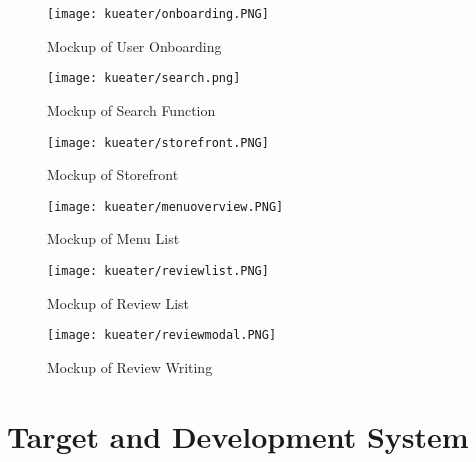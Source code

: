 \begin{figure}[h!]
    \begin{minipage}{.5\textwidth}
        \centering
        \texttt{[image: kueater/onboarding.PNG]}
        \small{\caption{Mockup of User Onboarding}}
    \end{minipage}%
    \begin{minipage}{.5\textwidth}
        \centering
        \texttt{[image: kueater/search.png]}
        \small{\caption{Mockup of Search Function}}
    \end{minipage}
    \vspace*{-\baselineskip}
\end{figure}

\begin{figure}[h!]
    \begin{minipage}{.5\textwidth}
        \centering
        \texttt{[image: kueater/storefront.PNG]}
        \small{\caption{Mockup of Storefront}}
    \end{minipage}%
    \begin{minipage}{.5\textwidth}
        \centering
        \texttt{[image: kueater/menuoverview.PNG]}
        \small{\caption{Mockup of Menu List}}
    \end{minipage}
    \vspace*{-\baselineskip}
\end{figure}


\begin{figure}[h!t]
    \begin{minipage}{.5\textwidth}
        \centering
        \texttt{[image: kueater/reviewlist.PNG]}
        \small{\caption{Mockup of Review List}}
    \end{minipage}%
    \begin{minipage}{.5\textwidth}
        \centering
        \texttt{[image: kueater/reviewmodal.PNG]}
        \small{\caption{Mockup of Review Writing}}
    \end{minipage}
\end{figure}


\newpage

\section{Target and Development System}
\label{section:development-system}


